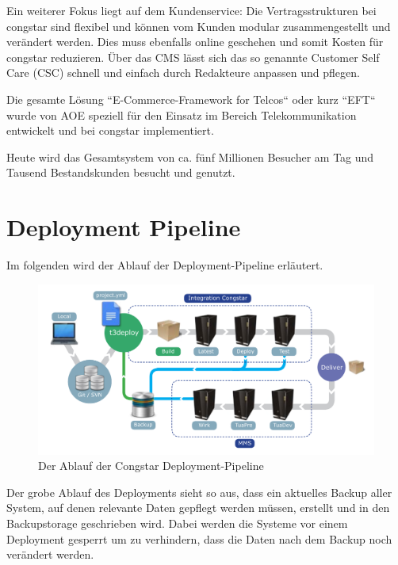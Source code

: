 \documentclass[11pt,a4paper]{article} %
\begin{document}
Ein weiterer Fokus liegt auf dem Kundenservice: Die Vertragsstrukturen bei congstar sind flexibel und können vom Kunden modular zusammengestellt und verändert werden. Dies muss ebenfalls online geschehen und somit Kosten für congstar reduzieren. Über das CMS lässt sich das so genannte Customer Self Care (CSC) schnell und einfach durch Redakteure anpassen und pflegen.

Die gesamte Lösung “E-Commerce-Framework for Telcos“ oder kurz “EFT“ wurde von AOE speziell für den Einsatz im Bereich Telekommunikation entwickelt und bei congstar implementiert.

Heute wird das Gesamtsystem von ca. fünf Millionen Besucher am Tag und Tausend Bestandskunden besucht und genutzt.

\section{Deployment Pipeline} \label{sec:pipeline}

Im folgenden wird der Ablauf der Deployment-Pipeline erläutert.

\begin{figure}[H]
\includegraphics[width=\textwidth]{images/DeploymentPipeline.pdf}
\caption{Der Ablauf der Congstar Deployment-Pipeline }
\centering
\end{figure}

Der grobe Ablauf des Deployments sieht so aus, dass ein aktuelles Backup aller System, auf denen relevante Daten gepflegt werden müssen, erstellt und in den Backupstorage geschrieben wird. Dabei werden die Systeme vor einem Deployment gesperrt um zu verhindern, dass die Daten nach dem Backup noch verändert werden.
\end{document}
